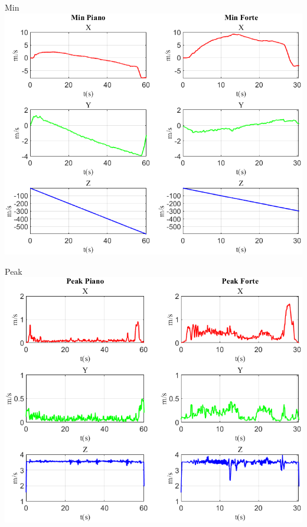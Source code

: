 	\begin{frame}{{Min}}
		\centering\includegraphics[height=.8\textheight]{figure/Vel/Min}
	\end{frame}
	
	\begin{frame}{{Peak}}
		\centering\includegraphics[height=.8\textheight]{figure/Vel/Peak}
	\end{frame}
	
